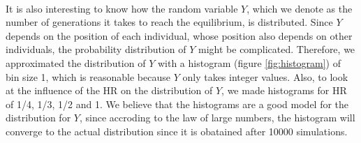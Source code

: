 \\
It is also interesting to know how the random variable $Y$, which we denote as the number of generations it takes to reach the equilibrium, is distributed. Since $Y$ depends on the position of each individual, whose position also depends on other individuals, the probability distribution of $Y$ might be complicated. Therefore, we approximated the distribution of $Y$ with a histogram (figure \ref{fig:histogram}) of bin size 1, which is reasonable because $Y$ only takes integer values. Also, to look at the influence of the HR on the distribution of $Y$, we made histograms for HR of 1/4, 1/3, 1/2 and 1.  We believe that the histograms are a good model for the distribution for $Y$, since accroding to the law of large numbers, the histogram will converge to the actual distribution since it is obatained after 10000 simulations.\\
\\
 
